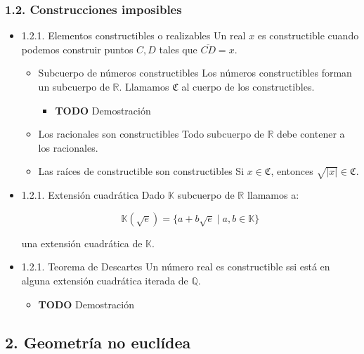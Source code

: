 \documentclass[11pt]{article}
\begin{document}
\subsubsection*{1.2. Construcciones imposibles}
\label{sec-5-1-2}
\begin{itemize}
\item 1.2.1. Elementos constructibles o realizables
\label{sec-5-1-2-1}
Un real $x$ es constructible cuando podemos construir puntos $C,D$ tales que
$\overline{CD} = x$.

\begin{itemize}
\item Subcuerpo de números constructibles
\label{sec-5-1-2-1-1}
Los números constructibles forman un subcuerpo de $\mathbb{R}$. Llamamos $\mathfrak{C}$ al
cuerpo de los constructibles.

\begin{itemize}
\item {\bfseries\sffamily TODO} Demostración
\label{sec-5-1-2-1-1-1}
\end{itemize}
\item Los racionales son constructibles
\label{sec-5-1-2-1-2}
Todo subcuerpo de $\mathbb{R}$ debe contener a los racionales.

\item Las raíces de constructible son constructibles
\label{sec-5-1-2-1-3}
Si $x \in\mathfrak{C}$, entonces $\sqrt{|x|} \in \mathfrak{C}$.
\end{itemize}

\item 1.2.1. Extensión cuadrática
\label{sec-5-1-2-2}
Dado $\mathbb{K}$ subcuerpo de $\mathbb{R}$ llamamos a:

\[
\mathbb{K}(\sqrt{e}) = \{ a+ b\sqrt{e} \mid a,b\in\mathbb{K}\}
\]

una extensión cuadrática de $\mathbb{K}$.

\item 1.2.1. Teorema de Descartes
\label{sec-5-1-2-3}
Un número real es constructible ssi está en alguna extensión cuadrática
iterada de $\mathbb{Q}$.

\begin{itemize}
\item {\bfseries\sffamily TODO} Demostración
\label{sec-5-1-2-3-1}
\end{itemize}
\end{itemize}

\subsection*{2. Geometría no euclídea}
\label{sec-5-2}
\end{document}
